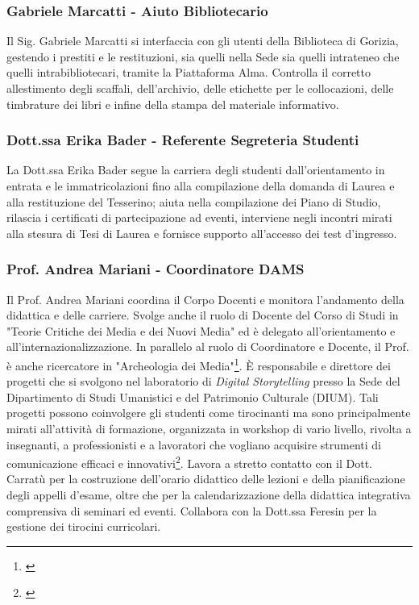         \subsubsection{Gabriele Marcatti - Aiuto Bibliotecario}
            Il Sig. Gabriele Marcatti si interfaccia con gli utenti della Biblioteca di Gorizia, gestendo i prestiti e le restituzioni, sia quelli nella Sede sia quelli intrateneo che quelli intrabibliotecari, tramite la Piattaforma Alma. Controlla il corretto allestimento degli scaffali, dell'archivio, delle etichette per le collocazioni, delle timbrature dei libri e infine della stampa del materiale informativo. 
        \subsubsection{Dott.ssa Erika Bader - Referente Segreteria Studenti}
            La Dott.ssa Erika Bader segue la carriera degli studenti dall'orientamento in entrata e le immatricolazioni fino alla compilazione della domanda di Laurea e alla restituzione del Tesserino; aiuta nella compilazione dei Piano di Studio, rilascia i certificati di partecipazione ad eventi, interviene negli incontri mirati alla stesura di Tesi di Laurea e fornisce supporto all'accesso dei test d'ingresso.
        \subsubsection{Prof. Andrea Mariani - Coordinatore DAMS}
            Il Prof. Andrea Mariani coordina il Corpo Docenti e monitora l'andamento della didattica e delle carriere. Svolge anche il ruolo di Docente del Corso di Studi in "Teorie Critiche dei Media e dei Nuovi Media" ed è delegato all'orientamento e all'internazionalizzazione. \newline
            In parallelo al ruolo di Coordinatore e Docente, il Prof. è anche ricercatore in "Archeologia dei Media"\footnote{\cite{AndreaMariani}}. È responsabile e direttore dei progetti che si svolgono nel laboratorio di \textsl{Digital Storytelling} presso la Sede del Dipartimento di Studi Umanistici e del Patrimonio Culturale (DIUM). Tali progetti possono coinvolgere gli studenti come tirocinanti ma sono principalmente mirati all'attività di formazione, organizzata in workshop di vario livello, rivolta a insegnanti, a professionisti e a lavoratori che vogliano acquisire strumenti di comunicazione efficaci e innovativi\footnote{\cite{DigitalStorytellingLAB}}.
            Lavora a stretto contatto con il Dott. Carratù per la costruzione dell'orario didattico delle lezioni e della pianificazione degli appelli d'esame, oltre che per la calendarizzazione della didattica integrativa comprensiva di seminari ed eventi. Collabora con la Dott.ssa Feresin per la gestione dei tirocini curricolari. 
